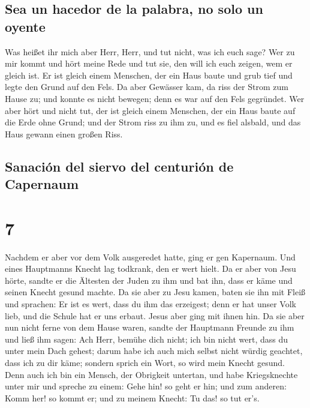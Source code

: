 \hypertarget{sea-un-hacedor-de-la-palabra-no-solo-un-oyente}{%
\subsection{Sea un hacedor de la palabra, no solo un
oyente}\label{sea-un-hacedor-de-la-palabra-no-solo-un-oyente}}

 Was heißet ihr mich aber Herr, Herr, und tut nicht, was
ich euch sage?  Wer zu mir kommt und hört meine Rede und
tut sie, den will ich euch zeigen, wem er gleich ist.  Er
ist gleich einem Menschen, der ein Haus baute und grub tief und legte
den Grund auf den Fels. Da aber Gewässer kam, da riss der Strom zum
Hause zu; und konnte es nicht bewegen; denn es war auf den Fels
gegründet.  Wer aber hört und nicht tut, der ist gleich
einem Menschen, der ein Haus baute auf die Erde ohne Grund; und der
Strom riss zu ihm zu, und es fiel alsbald, und das Haus gewann einen
großen Riss.

\hypertarget{sanaciuxf3n-del-siervo-del-centuriuxf3n-de-capernaum}{%
\subsection{Sanación del siervo del centurión de
Capernaum}\label{sanaciuxf3n-del-siervo-del-centuriuxf3n-de-capernaum}}

\hypertarget{section-6}{%
\section{7}\label{section-6}}

 Nachdem er aber vor dem Volk ausgeredet hatte, ging er
gen Kapernaum.  Und eines Hauptmanns Knecht lag todkrank,
den er wert hielt.  Da er aber von Jesu hörte, sandte er
die Ältesten der Juden zu ihm und bat ihn, dass er käme und seinen
Knecht gesund machte.  Da sie aber zu Jesu kamen, baten
sie ihn mit Fleiß und sprachen: Er ist es wert, dass du ihm das
erzeigest;  denn er hat unser Volk lieb, und die Schule
hat er uns erbaut.  Jesus aber ging mit ihnen hin. Da sie
aber nun nicht ferne von dem Hause waren, sandte der Hauptmann Freunde
zu ihm und ließ ihm sagen: Ach Herr, bemühe dich nicht; ich bin nicht
wert, dass du unter mein Dach gehest;  darum habe ich auch
mich selbst nicht würdig geachtet, dass ich zu dir käme; sondern sprich
ein Wort, so wird mein Knecht gesund.  Denn auch ich bin
ein Mensch, der Obrigkeit untertan, und habe Kriegsknechte unter mir und
spreche zu einem: Gehe hin! so geht er hin; und zum anderen: Komm her!
so kommt er; und zu meinem Knecht: Tu das! so tut er's.

